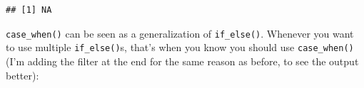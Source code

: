 \documentclass[]{gitbook}
\newenvironment{Shaded}{\begin{snugshade}}{\end{snugshade}}
\newcommand{\DataTypeTok}[1]{\textcolor[rgb]{0.13,0.29,0.53}{#1}}
\newcommand{\DecValTok}[1]{\textcolor[rgb]{0.00,0.00,0.81}{#1}}
\newcommand{\KeywordTok}[1]{\textcolor[rgb]{0.13,0.29,0.53}{\textbf{#1}}}
\newcommand{\NormalTok}[1]{#1}
\newcommand{\OperatorTok}[1]{\textcolor[rgb]{0.81,0.36,0.00}{\textbf{#1}}}
\newcommand{\StringTok}[1]{\textcolor[rgb]{0.31,0.60,0.02}{#1}}
\theoremstyle{definition}
\theoremstyle{definition}
\theoremstyle{definition}
\theoremstyle{remark}
\begin{document}
\begin{verbatim}
## [1] NA
\end{verbatim}

\texttt{case\_when()} can be seen as a generalization of
\texttt{if\_else()}. Whenever you want to use multiple
\texttt{if\_else()}s, that's when you know you should use
\texttt{case\_when()} (I'm adding the filter at the end for the same
reason as before, to see the output better):

\begin{Shaded}
\end{Shaded}
\end{document}
